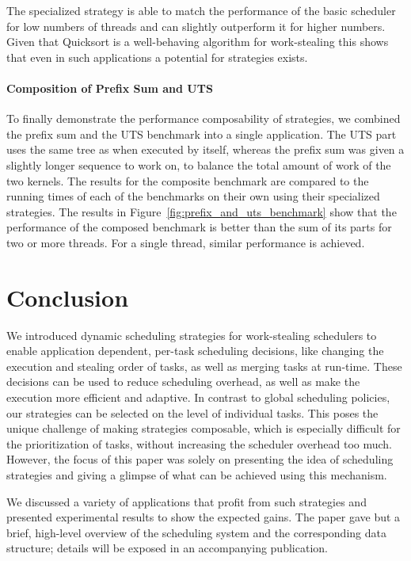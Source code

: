 \documentclass[a4paper,11pt]{article}
\begin{document}
The specialized strategy is able to match the performance of the basic
scheduler for low numbers of threads and can slightly outperform it
for higher numbers. Given that Quicksort is a well-behaving algorithm
for work-stealing this shows that even in such applications a
potential for strategies exists.

\paragraph{Composition of Prefix Sum and UTS}
\label{sec:scan_uts}

To finally demonstrate the performance composability of strategies, we
combined the prefix sum and the UTS benchmark into a single
application. The UTS part uses the same tree as when executed by
itself, whereas the prefix sum was given a slightly longer sequence to
work on, to balance the total amount of work of the two kernels.
The results for the composite benchmark are compared to the
running times of each of the benchmarks on their own using their
specialized strategies. The results in
Figure~\ref{fig:prefix_and_uts_benchmark} show that the performance of
the composed benchmark is better than the sum of its parts for two or
more threads. For a single thread, similar performance is achieved.

\section{Conclusion}

We introduced dynamic scheduling strategies for work-stealing
schedulers to enable application dependent, per-task scheduling
decisions, like changing the execution and stealing order of tasks, as
well as merging tasks at run-time. These decisions can be used to
reduce scheduling overhead, as well as make the execution more
efficient and adaptive.  In contrast to global scheduling policies,
our strategies can be selected on the level of individual tasks. This
poses the unique challenge of making strategies composable, which is
especially difficult for the prioritization of tasks, without
increasing the scheduler overhead too much. However, the focus of this
paper was solely on presenting the idea of scheduling strategies and
giving a glimpse of what can be achieved using this mechanism.

We discussed a variety of applications that profit from such
strategies and presented experimental results to show the expected
gains. The paper gave but a brief, high-level overview of the
scheduling system and the corresponding data structure; details will
be exposed in an accompanying publication.
\end{document}
